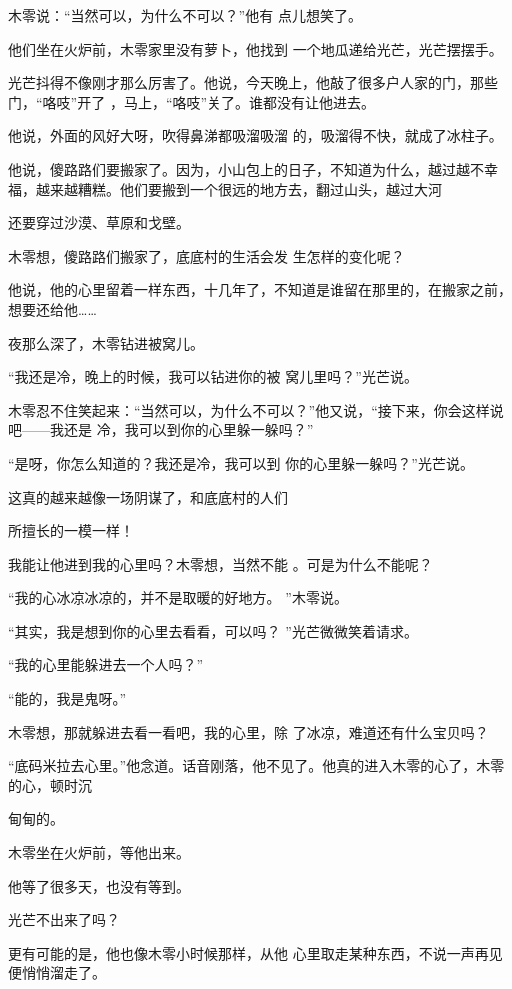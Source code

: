 \documentclass{article}
\begin{document}
木零说：“当然可以，为什么不可以？”他有
点儿想笑了。 

他们坐在火炉前，木零家里没有萝卜，他找到
一个地瓜递给光芒，光芒摆摆手。 

光芒抖得不像刚才那么厉害了。他说，今天晚上，他敲了很多户人家的门，那些门，“咯吱”开了
，马上，“咯吱”关了。谁都没有让他进去。 

他说，外面的风好大呀，吹得鼻涕都吸溜吸溜
的，吸溜得不快，就成了冰柱子。 

他说，傻路路们要搬家了。因为，小山包上的日子，不知道为什么，越过越不幸福，越来越糟糕。他们要搬到一个很远的地方去，翻过山头，越过大河
\newpage

还要穿过沙漠、草原和戈壁。 

木零想，傻路路们搬家了，底底村的生活会发
生怎样的变化呢？ 

他说，他的心里留着一样东西，十几年了，不知道是谁留在那里的，在搬家之前，想要还给他……


夜那么深了，木零钻进被窝儿。 

“我还是冷，晚上的时候，我可以钻进你的被
窝儿里吗？”光芒说。 

木零忍不住笑起来：“当然可以，为什么不可以？”他又说，“接下来，你会这样说吧——我还是
冷，我可以到你的心里躲一躲吗？” 

“是呀，你怎么知道的？我还是冷，我可以到
你的心里躲一躲吗？”光芒说。 

这真的越来越像一场阴谋了，和底底村的人们
\newpage

所擅长的一模一样！ 

我能让他进到我的心里吗？木零想，当然不能
。可是为什么不能呢？ 

“我的心冰凉冰凉的，并不是取暖的好地方。
”木零说。 

“其实，我是想到你的心里去看看，可以吗？
”光芒微微笑着请求。 


“我的心里能躲进去一个人吗？” 


“能的，我是鬼呀。” 

木零想，那就躲进去看一看吧，我的心里，除
了冰凉，难道还有什么宝贝吗？ 

“底码米拉去心里。”他念道。话音刚落，他不见了。他真的进入木零的心了，木零的心，顿时沉

\newpage
甸甸的。 


木零坐在火炉前，等他出来。 


他等了很多天，也没有等到。 


光芒不出来了吗？ 

更有可能的是，他也像木零小时候那样，从他
心里取走某种东西，不说一声再见便悄悄溜走了。 
\end{document}
